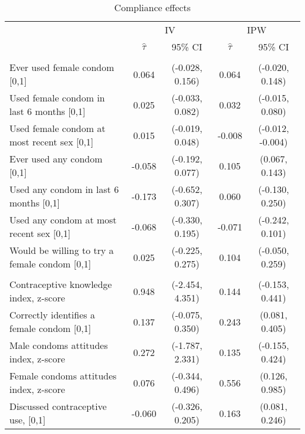 \begin{table}

\caption{\label{tab:}Compliance effects}
\centering
\fontsize{9}{11}\selectfont
\begin{tabular}[t]{lcccc}
\toprule
\multicolumn{1}{c}{ } & \multicolumn{2}{c}{IV} & \multicolumn{2}{c}{IPW} \\
\cmidrule(l{3pt}r{3pt}){2-3} \cmidrule(l{3pt}r{3pt}){4-5}
 & $\widehat{\tau}$ & 95\% CI & $\widehat{\tau}$ & 95\% CI\\
\midrule
\rowcolor{gray!6}  \addlinespace[0.3em]
\multicolumn{5}{l}{\textit{Primary outcomes}}\\
\hspace{1em}Ever used female condom [0,1] & 0.064 & (-0.028, 0.156) & 0.064 & (-0.020, 0.148)\\
\hspace{1em}Used female condom in last 6 months [0,1] & 0.025 & (-0.033, 0.082) & 0.032 & (-0.015, 0.080)\\
\rowcolor{gray!6}  \hspace{1em}Used female condom at most recent sex [0,1] & 0.015 & (-0.019, 0.048) & -0.008 & (-0.012, -0.004)\\
\hspace{1em}Ever used any condom [0,1] & -0.058 & (-0.192, 0.077) & 0.105 & (0.067, 0.143)\\
\rowcolor{gray!6}  \hspace{1em}Used any condom in last 6 months [0,1] & -0.173 & (-0.652, 0.307) & 0.060 & (-0.130, 0.250)\\
\hspace{1em}Used any condom at most recent sex [0,1] & -0.068 & (-0.330, 0.195) & -0.071 & (-0.242, 0.101)\\
\rowcolor{gray!6}  \hspace{1em}Would be willing to try a female condom [0,1] & 0.025 & (-0.225, 0.275) & 0.104 & (-0.050, 0.259)\\
\addlinespace[0.3em]
\multicolumn{5}{l}{\textit{Secondary outcomes}}\\
\hspace{1em}Contraceptive knowledge index, z-score & 0.948 & (-2.454, 4.351) & 0.144 & (-0.153, 0.441)\\
\rowcolor{gray!6}  \hspace{1em}Correctly identifies a female condom [0,1] & 0.137 & (-0.075, 0.350) & 0.243 & (0.081, 0.405)\\
\hspace{1em}Male condoms attitudes index, z-score & 0.272 & (-1.787, 2.331) & 0.135 & (-0.155, 0.424)\\
\rowcolor{gray!6}  \hspace{1em}Female condoms attitudes index, z-score & 0.076 & (-0.344, 0.496) & 0.556 & (0.126, 0.985)\\
\hspace{1em}Discussed contraceptive use, [0,1] & -0.060 & (-0.326, 0.205) & 0.163 & (0.081, 0.246)\\
\bottomrule
\end{tabular}
\end{table}

